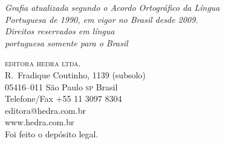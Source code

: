 \vfill

\textit{Grafia atualizada segundo o Acordo Ortográfico da Língua\\
Portuguesa de 1990, em vigor no Brasil desde 2009.}\\

\textit{Direitos reservados em língua\\ 
portuguesa somente para o Brasil}\\\medskip

\textsc{editora hedra ltda.}\\
R.~Fradique Coutinho, 1139 (subsolo)\\
05416--011 São Paulo \textsc{sp} Brasil\\
Telefone/Fax +55 11 3097 8304\\\smallskip
editora@hedra.com.br\\
www.hedra.com.br\\
\bigskip
Foi feito o depósito legal.

\endgroup
\pagebreak